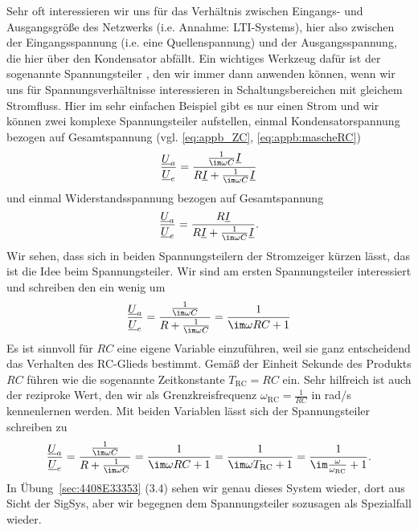 Sehr oft interessieren wir uns für das Verhältnis zwischen Eingangs- und Ausgangsgröße
des Netzwerks (i.e. Annahme: LTI-Systems), hier also zwischen der Eingangsspannung
(i.e. eine Quellenspannung) und der Ausgangsspannung, die hier über den Kondensator
abfällt.
Ein wichtiges Werkzeug dafür ist der sogenannte Spannungsteiler
\cite[Kap. 3.1.2, 11.2.1]{Marinescu2020}, den wir immer dann anwenden können,
wenn wir uns für Spannungsverhältnisse interessieren in Schaltungsbereichen mit
gleichem Stromfluss.
Hier im sehr einfachen Beispiel gibt es nur einen Strom und wir können
zwei komplexe Spannungsteiler aufstellen, einmal Kondensatorspannung bezogen auf
Gesamtspannung (vgl. \eqref{eq:appb_ZC}, \eqref{eq:appb:mascheRC})
\begin{align}
\frac{\underline{U}_a}{\underline{U}_e} = \frac{\frac{1}{\im \omega C}\underline{I}}{R \underline{I}+\frac{1}{\im \omega C} \underline{I}}
\end{align}
und einmal Widerstandsspannung bezogen auf Gesamtspannung
\begin{align}
\frac{\underline{U}_a}{\underline{U}_e} = \frac{R\underline{I}}{R \underline{I}+\frac{1}{\im \omega C} \underline{I}}.
\end{align}
Wir sehen, dass sich in beiden Spannungsteilern der Stromzeiger kürzen lässt,
das ist die Idee beim Spannungsteiler.
Wir sind am ersten Spannungsteiler interessiert und schreiben den ein wenig
um
\begin{align}
\frac{\underline{U}_a}{\underline{U}_e} = \frac{\frac{1}{\im \omega C}}{R +\frac{1}{\im \omega C}}=
\frac{1}{\im \omega R C + 1}
\end{align}
Es ist sinnvoll für $RC$ eine eigene Variable einzuführen, weil sie ganz entscheidend
das Verhalten des RC-Glieds bestimmt.
Gemäß der Einheit Sekunde des Produkts $R C$ führen wie die sogenannte Zeitkonstante
$T_\text{RC} = R C$ ein.
%
Sehr hilfreich ist auch der reziproke Wert, den wir als Grenzkreisfrequenz
$\omega_\text{RC} = \frac{1}{R C}$ in rad/s kennenlernen werden.
%
Mit beiden Variablen lässt sich der Spannungsteiler schreiben zu
\begin{align}
\frac{\underline{U}_a}{\underline{U}_e} = \frac{\frac{1}{\im \omega C}}{R +\frac{1}{\im \omega C}}=
\frac{1}{\im \omega R C + 1} =
\frac{1}{\im \omega T_\text{RC} + 1} =
\frac{1}{\im \frac{\omega}{\omega_\text{RC}} + 1}.
\end{align}
In Übung~\ref{sec:4408E33353} (3.4) sehen wir genau dieses System wieder, dort aus Sicht der SigSys, aber
wir begegnen dem Spannungsteiler sozusagen als Spezialfall wieder.
